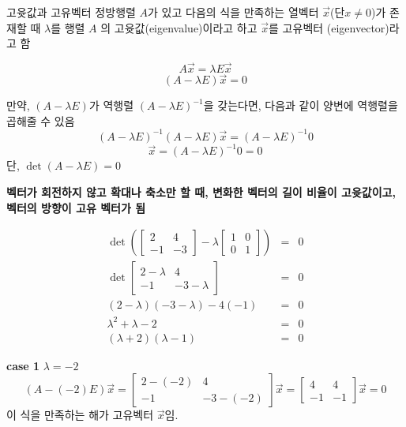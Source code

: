 \documentclass[10pt,t]{beamer}
\begin{document}
\begin{frame}{고윳값과 고유벡터}
    정방행렬 $A$가 있고 다음의 식을 만족하는 열벡터 $\vec{x}$(단$x\neq 0$)가 존재할 때 $\lambda$를 행렬 $A$ 의 고윳값(eigenvalue)이라고 하고 $\vec{x}$를 고유벡터 (eigenvector)라고 함

    \[A\vec{x} = \lambda E\vec{x}\]
    \[(A -\lambda E)\vec{x} = 0\]

    만약, $(A -\lambda E)$가 역행렬 $(A -\lambda E)^{-1}$을 갖는다면, 다음과 같이 양변에 역행렬을 곱해줄 수 있음
    \[(A -\lambda E)^{-1}(A -\lambda  E)\vec{x} = (A -\lambda E)^{-1} 0\]
    \[\vec{x} = (A -\lambda E)^{-1} 0 = 0\]
    단, $\det(A -\lambda E) = 0$

    \pagebreak
    \textbf{벡터가 회전하지 않고 확대나 축소만 할 때, 변화한 벡터의 길이 비율이 고윳값이고, 벡터의 방향이 고유 벡터가 됨}

    \begin{eqnarray*}
        \det \left( \begin{bmatrix}
            2 & 4 \\
            -1 & -3
        \end{bmatrix} - \lambda \begin{bmatrix}
            1 & 0 \\
            0 & 1 
        \end{bmatrix} \right) &=& 0\\
        \det \begin{bmatrix}
            2-\lambda & 4 \\
            -1 & -3- \lambda
        \end{bmatrix} &=& 0\\
        (2-\lambda)(-3-\lambda) - 4(-1) &=& 0\\
        \lambda ^2+\lambda -2 &=& 0\\
        (\lambda +2)(\lambda -1)&=&0
    \end{eqnarray*}


\pagebreak
    
\textbf{case 1} $\lambda = -2 $
    \[ (A-(-2)E)\vec{x} = \begin{bmatrix}
        2-(-2)& 4\\
        -1&-3-(-2)
    \end{bmatrix}\vec{x} = \begin{bmatrix}
        4 & 4\\
        -1 & -1
    \end{bmatrix}\vec{x} =0\]
이 식을 만족하는 해가 고유벡터 $\vec{x}$임. 


\end{frame}
\end{document}
